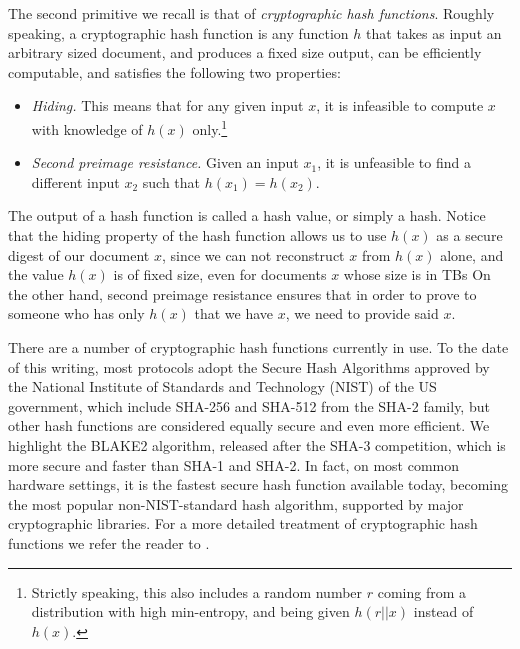 The second primitive we recall is that of {\em cryptographic hash functions}. Roughly speaking, a cryptographic hash function is any function $h$ that takes as input an arbitrary sized document, and produces a fixed size output, can be efficiently computable, and satisfies the following two properties:
\begin{itemize}
\item {\em Hiding.} This means that for any given input $x$, it is infeasible to compute $x$ with knowledge of $h(x)$ only.\footnote{Strictly speaking, this also includes a random number $r$ coming from a distribution with high min-entropy, and being given $h(r||x)$ instead of $h(x)$.}
\item {\em Second preimage resistance.} Given an input $x_1$, it is unfeasible to find a different input $x_2$ such that $h(x_1)=h(x_2)$.
\end{itemize}
The output of a hash function is called a hash value, or simply a hash. Notice that the hiding property of the hash function allows us to use $h(x)$ as a secure digest of our document $x$, since we can not reconstruct $x$ from $h(x)$ alone, and the value $h(x)$ is of fixed size, even for documents $x$ whose size is in TBs %
On the other hand, second preimage resistance ensures that in order to prove to someone who has only $h(x)$ that we have $x$, we need to provide said $x$. 

There are a number of cryptographic hash functions currently in use. To the date of this writing, most protocols adopt the Secure Hash Algorithms\cite{sha_standard} approved by the National Institute of Standards and Technology (NIST) of the US government, which include SHA-256 and SHA-512 from the SHA-2 family, but other hash functions are considered equally secure and even more efficient. We highlight the BLAKE2 algorithm, released after the SHA-3 competition, which is more secure and faster than SHA-1 and SHA-2. In fact, on most common hardware settings, it is the fastest secure hash function available today, becoming the most popular non-NIST-standard hash algorithm, supported by major cryptographic libraries. For a more detailed treatment of cryptographic hash functions we refer the reader to \cite{sha_standard,aumasson,sha3zoo,bitcoinbook}. %

